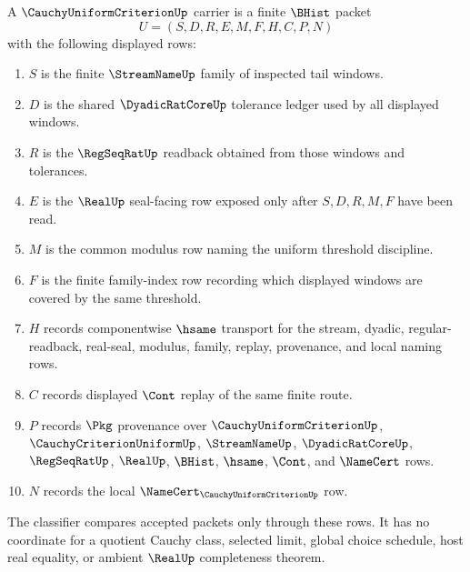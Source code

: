 \begin{definition}
\label{def:cauchy-uniform-criterion-carrier}
A $\CauchyUniformCriterionUp$ carrier is a finite $\BHist$ packet
$$
U=(S,D,R,E,M,F,H,C,P,N)
$$
with the following displayed rows:
\begin{enumerate}
\item $S$ is the finite $\StreamNameUp$ family of inspected tail windows.
\item $D$ is the shared $\DyadicRatCoreUp$ tolerance ledger used by all displayed windows.
\item $R$ is the $\RegSeqRatUp$ readback obtained from those windows and tolerances.
\item $E$ is the $\RealUp$ seal-facing row exposed only after $S,D,R,M,F$ have been read.
\item $M$ is the common modulus row naming the uniform threshold discipline.
\item $F$ is the finite family-index row recording which displayed windows are covered by the same threshold.
\item $H$ records componentwise $\hsame$ transport for the stream, dyadic, regular-readback, real-seal, modulus, family, replay, provenance, and local naming rows.
\item $C$ records displayed $\Cont$ replay of the same finite route.
\item $P$ records $\Pkg$ provenance over $\CauchyUniformCriterionUp$, $\CauchyCriterionUniformUp$, $\StreamNameUp$, $\DyadicRatCoreUp$, $\RegSeqRatUp$, $\RealUp$, $\BHist$, $\hsame$, $\Cont$, and $\NameCert$ rows.
\item $N$ records the local $\NameCert_{\CauchyUniformCriterionUp}$ row.
\end{enumerate}
The classifier compares accepted packets only through these rows. It has no coordinate for a quotient Cauchy class, selected limit, global choice schedule, host real equality, or ambient $\RealUp$ completeness theorem.
\end{definition}

